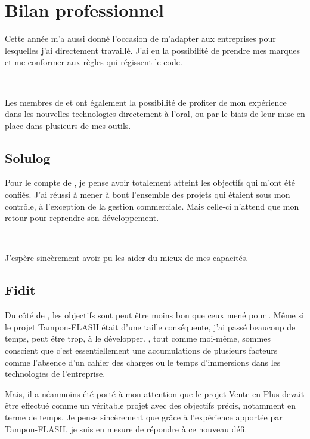 \chapter{Bilan professionnel}
Cette année m'a aussi donné l'occasion de m'adapter aux entreprises pour lesquelles j'ai directement travaillé. J'ai eu la possibilité de prendre mes marques et me conformer aux règles qui régissent le code.

~

Les membres de \solulog{} et \fidit{} ont également la possibilité de profiter de mon expérience dans les nouvelles technologies directement à l'oral, ou par le biais de leur mise en place dans plusieurs de mes outils.

\section{Solulog}
Pour le compte de \solulog, je pense avoir totalement atteint les objectifs qui m'ont été confiés. J'ai réussi à mener à bout l'ensemble des projets qui étaient sous mon contrôle, à l'exception de la gestion commerciale. Mais celle-ci n'attend que mon retour pour reprendre son développement.

~

J'espère sincèrement avoir pu les aider du mieux de mes capacités.

\section{Fidit}
Du côté de \fidit, les objectifs sont peut être moins bon que ceux mené pour \solulog. Même si le projet Tampon-FLASH était d'une taille conséquente, j'ai passé beaucoup de temps, peut être trop, à le développer. \fidit, tout comme moi-même, sommes conscient que c'est essentiellement une accumulations de plusieurs facteurs comme l'absence d'un cahier des charges ou le temps d'immersions dans les technologies de l'entreprise.

Mais, il a néanmoins été porté à mon attention que le projet \og Vente en Plus \fg{} devait être effectué comme un véritable projet avec des objectifs précis, notamment en terme de temps. Je pense sincèrement que grâce à l'expérience apportée par Tampon-FLASH, je suis en mesure de répondre à ce nouveau défi.
